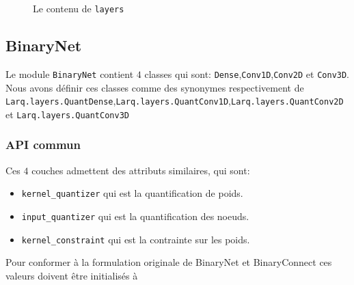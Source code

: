 \begin{figure}[htp]
	\small
	\centering
	\caption{Le contenu de \texttt{layers}}
\end{figure}
\FloatBarrier
\newpage
\subsection{BinaryNet}\label{BinaryNet:Module}
Le module \texttt{BinaryNet} contient $4$ classes qui sont: \texttt{Dense},\texttt{Conv1D},\texttt{Conv2D} et \texttt{Conv3D}.
Nous avons définir ces classes comme des synonymes respectivement de \texttt{Larq.layers.QuantDense},\texttt{Larq.layers.QuantConv1D},\texttt{Larq.layers.QuantConv2D} et \texttt{Larq.layers.QuantConv3D}
\subsubsection{API commun}
Ces $4$ couches admettent des attributs similaires, qui sont:
\begin{itemize}
	\item \texttt{kernel\_quantizer} qui est la quantification de poids.
	\item \texttt{input\_quantizer} qui est la quantification des noeuds. 
	\item \texttt{kernel\_constraint} qui est la contrainte sur les poids.
\end{itemize}
Pour conformer à la formulation originale de BinaryNet \cite{BinaryNetPaper} et BinaryConnect \cite{BinaryConnectPaper} ces valeurs doivent être initialisés à 

